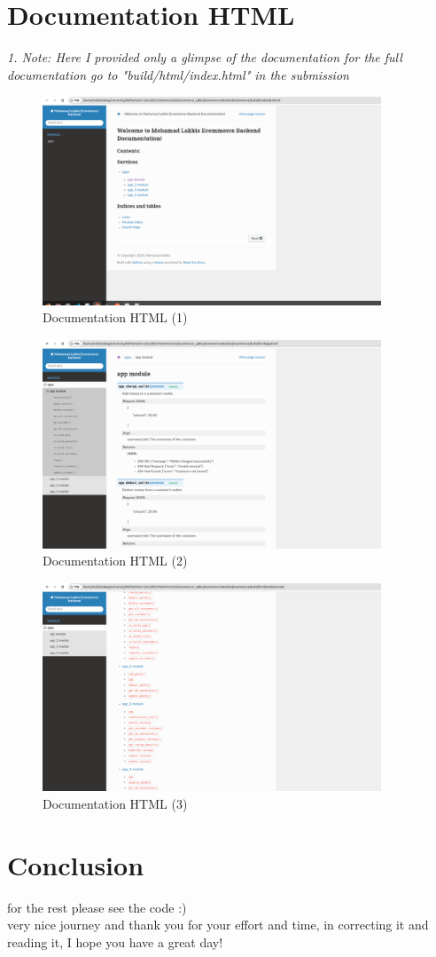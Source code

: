 \documentclass[a4paper,12pt]{article}
\begin{document}
\section{Documentation HTML}
\textit{1. Note: Here I provided only a glimpse of the documentation for the full documentation go to "build/html/index.html" in the submission}
\begin{figure}[H]
  \centering
  \includegraphics[width=0.9\textwidth]{images/40.png}
  \caption{Documentation HTML (1)}
\end{figure}
\begin{figure}[H]
  \centering
  \includegraphics[width=0.9\textwidth]{images/41.png}
  \caption{Documentation HTML (2)}
\end{figure}
\begin{figure}[H]
  \centering
  \includegraphics[width=0.9\textwidth]{images/42.png}
  \caption{Documentation HTML (3)}
\end{figure}
\section{Conclusion}
for the rest please see the code :) \\ 
very nice journey and thank you for your effort and time, in correcting it and reading it, I hope you have a great day!\\
\end{document}
